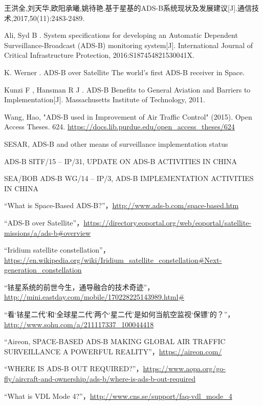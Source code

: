 
\begin{thebibliography}{99}

王洪全,刘天华,欧阳承曦,姚待艳.基于星基的ADS-B系统现状及发展建议[J].通信技术,2017,50(11):2483-2489.




 Ali, Syd B . System specifications for developing an Automatic Dependent Surveillance-Broadcast (ADS-B) monitoring system[J]. International Journal of Critical Infrastructure Protection, 2016:S187454821530041X.

 K. Werner . ADS-B over Satellite The world’s first ADS-B receiver in Space.

 Kunzi F , Hansman R J . ADS-B Benefits to General Aviation and Barriers to Implementation[J]. Massachusetts Institute of Technology, 2011.

 Wang, Hao, "ADS-B used in Improvement of Air Traffic Control" (2015). Open Access Theses. 624.
\url{https://docs.lib.purdue.edu/open_access_theses/624}

 SESAR, ADS-B and other means of surveillance implementation status

 ADS-B SITF/15 – IP/31, UPDATE ON ADS-B ACTIVITIES IN CHINA

 SEA/BOB ADS-B WG/14 – IP/3, ADS-B IMPLEMENTATION ACTIVITIES IN CHINA



“What is Space-Based ADS-B?”，\url{http://www.ads-b.com/space-based.htm}

“ADS-B over Satellite”，\url{https://directory.eoportal.org/web/eoportal/satellite-missions/a/ads-b#overview}

“Iridium satellite constellation”，\url{https://en.wikipedia.org/wiki/Iridium_satellite_constellation#Next-generation_constellation}

“铱星系统的前世今生，通导融合的技术奇迹”，\url{http://mini.eastday.com/mobile/170228225143989.html#}

“看‘铱星二代’和‘全球星二代’两个‘星二代’是如何当航空监视‘保镖’的？”，\url{http://www.sohu.com/a/211117337_100044418}

“Aireon, SPACE-BASED ADS-B MAKING GLOBAL AIR TRAFFIC SURVEILLANCE A POWERFUL REALITY”，\url{https://aireon.com/}

“WHERE IS ADS-B OUT REQUIRED?”，\url{https://www.aopa.org/go-fly/aircraft-and-ownership/ads-b/where-is-ads-b-out-required}

“What is VDL Mode 4?”，\url{http://www.cns.se/support/faq-vdl_mode_4}

\end{thebibliography}